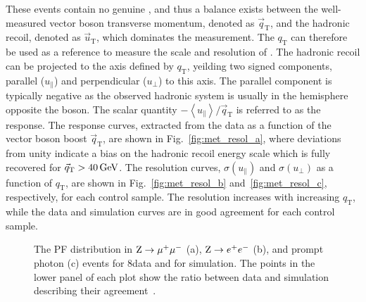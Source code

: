 These events contain no genuine \ptvecmiss, and thus a balance exists between the well-measured vector boson transverse momentum, denoted as ${\vec q}_\mathrm{T}$, and the hadronic recoil, denoted as ${\vec u}_\mathrm{T}$,  which dominates the \ptvecmiss measurement. The $q_\mathrm{T}$ can therefore be used as a reference to measure the scale and resolution of \ptvecmiss.
The hadronic recoil can be projected to the axis defined by $q_\mathrm{T}$, yeilding two signed components, parallel ($u_\parallel$) and perpendicular ($u_\perp$) to this axis. The parallel component is typically negative as the observed hadronic system is usually in the hemisphere opposite the boson. The scalar quantity $-\left\langle u_\parallel\right\rangle/{\vec q}_\mathrm{T}$ is referred to as the \ptvecmiss response. The response curves, extracted from the data as a function of the vector boson boost ${\vec q}_\mathrm{T}$, are shown in Fig.~\ref{fig:met_resol_a}, where deviations from unity indicate a bias on the hadronic recoil energy scale which is  fully recovered for ${\vec q}_\mathrm{T} > 40\,\text{Ge\hspace{-.08em}V}$.
The resolution curves, $\sigma(u_\parallel)$ and $\sigma(u_\perp)$ as a function of $q_\mathrm{T}$, are shown in Fig.~\ref{fig:met_resol_b} and~\ref{fig:met_resol_c}, respectively, for each control sample. The resolution increases with increasing $q_\mathrm{T}$, while the data and simulation curves are in good agreement for each control sample.\\

\begin{figure}[!htb]
\begin{center}
\end{center} 
\caption{The PF \ETmiss distribution in $\mathrm{Z}\to\mu^+\mu^-$ (a), $\mathrm{Z}\to e^+e^-$ (b), and prompt photon (c) events for 8\TeV data and for simulation. The points in the lower panel of each plot show the ratio between data and simulation describing their agreement~\cite{Khachatryan:2014gga}.}
\label{fig:met_distr}
\end{figure}

